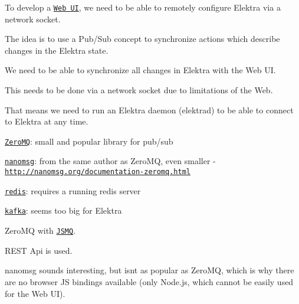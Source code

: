To develop a \href{https://github.com/ElektraInitiative/libelektra/issues/252}{\tt Web UI}, we need to be able to remotely configure Elektra via a network socket.

The idea is to use a Pub/\+Sub concept to synchronize actions which describe changes in the Elektra state.


\begin{DoxyItemize}
\item We need to be able to synchronize all changes in Elektra with the Web UI.
\item This needs to be done via a network socket due to limitations of the Web.
\item That means we need to run an Elektra daemon ({\ttfamily elektrad}) to be able to connect to Elektra at any time.
\end{DoxyItemize}


\begin{DoxyItemize}
\item \href{http://zeromq.org/}{\tt Zero\+MQ}\+: small and popular library for pub/sub
\item \href{http://nanomsg.org/}{\tt nanomsg}\+: from the same author as Zero\+MQ, even smaller -\/ \href{http://nanomsg.org/documentation-zeromq.html}{\tt http\+://nanomsg.\+org/documentation-\/zeromq.\+html}
\item \href{http://redis.io/topics/pubsub}{\tt redis}\+: requires a running redis server
\item \href{http://kafka.apache.org/}{\tt kafka}\+: seems too big for Elektra
\item Zero\+MQ with \href{https://github.com/zeromq/JSMQ}{\tt J\+S\+MQ}.
\end{DoxyItemize}

R\+E\+ST Api is used.

nanomsg sounds interesting, but isn\textquotesingle{}t as popular as Zero\+MQ, which is why there are no browser JS bindings available (only Node.\+js, which cannot be easily used for the Web UI).